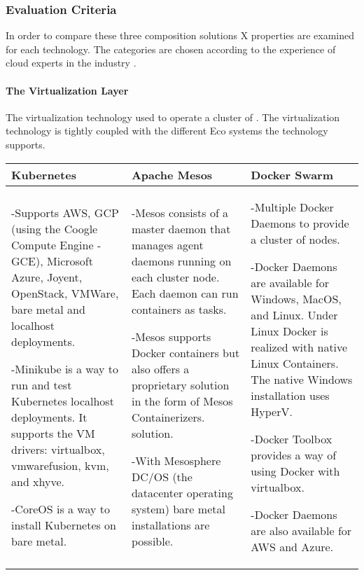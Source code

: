 \subsubsection{Evaluation Criteria}

In order to compare these three composition solutions X properties are examined
for each technology. The categories are chosen according to the experience of
cloud experts in the industry \cite{toll2016cloud_expert_eval}
\cite{lerilli2012cloud_eval_criteria} \cite{voras2011evaluating}.

\paragraph{The Virtualization Layer}

The virtualization technology used to operate a cluster of \mss{}. The
virtualization technology is tightly coupled with the different Eco systems the
technology supports.

\begin{center}
  \begin{tabular}{ | p{4.5cm} | p{4.5cm} | p{4.5cm} | }
    \hline
    \textbf{Kubernetes}&\textbf{Apache Mesos}&\textbf{Docker Swarm}\\\hline
    -Supports AWS, GCP (using the Coogle Compute Engine - GCE), Microsoft Azure,
    Joyent, OpenStack, VMWare, bare metal and localhost deployments.
    
    -Minikube is a way to run and test Kubernetes localhost deployments. It
    supports the VM drivers: virtualbox, vmwarefusion, kvm, and xhyve.
    
    -CoreOS is a way to install Kubernetes on bare metal.&
    
    -Mesos consists of a master daemon that manages agent daemons running on
    each cluster node. Each daemon can run containers as tasks. 
    
    -Mesos supports Docker containers but also offers a proprietary solution in
    the form of Mesos Containerizers. solution.
    
    -With Mesosphere DC/OS (the datacenter operating system) bare metal
    installations are possible. &
    
    -Multiple Docker Daemons to provide a cluster of nodes. 
    
    -Docker Daemons are available for Windows, MacOS, and Linux. Under Linux
    Docker is realized with native Linux Containers. The native Windows
    installation uses HyperV.
    
    -Docker Toolbox provides a way of using Docker with virtualbox.
    
    -Docker Daemons are also available for AWS and Azure.\\
    \hline
  \end{tabular}
\end{center}


